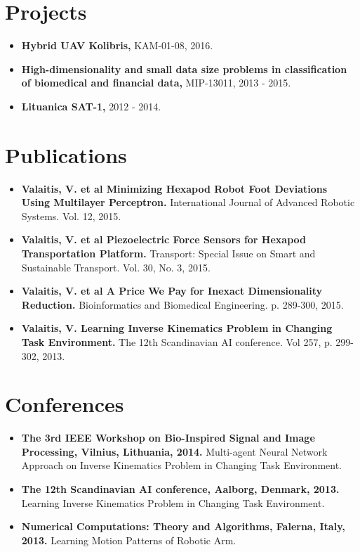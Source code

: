 \documentclass[letterpaper,11pt]{article}
\newcommand{\resumeItem}[2]{
  \item\small{
    \textbf{#1}{ #2 \vspace{-2pt}}
  }
}
\newcommand{\resumeSubItem}[2]{\resumeItem{#1}{#2}\vspace{-4pt}}
\newcommand{\resumeSubHeadingListStart}{\begin{itemize}[leftmargin=*] \renewcommand\labelitemi{$\circ$}}
\newcommand{\resumeSubHeadingListEnd}{\end{itemize}}
\begin{document}
\section{Projects}
  \resumeSubHeadingListStart
    \resumeSubItem{Hybrid UAV Kolibris,}{KAM-01-08, 2016.}
    \resumeSubItem{High-dimensionality and small data size problems in classification of biomedical and financial data,}{MIP-13011, 2013 - 2015.}
    \resumeSubItem{Lituanica SAT-1,}{2012 - 2014.}
  \resumeSubHeadingListEnd

\section{Publications}
    \resumeSubHeadingListStart
    \resumeSubItem{Valaitis, V. et al Minimizing Hexapod Robot Foot Deviations Using Multilayer Perceptron.}{International Journal of Advanced Robotic Systems. Vol. 12, 2015.}
    \resumeSubItem{Valaitis, V. et al Piezoelectric Force Sensors for Hexapod Transportation Platform.}{Transport: Special Issue on Smart and Sustainable Transport. Vol. 30, No. 3, 2015.}
    \resumeSubItem{Valaitis, V. et al A Price We Pay for Inexact Dimensionality Reduction.}{Bioinformatics and Biomedical Engineering. p. 289-300, 2015.}
    \resumeSubItem{Valaitis, V. Learning Inverse Kinematics Problem in Changing Task Environment.}{The 12th Scandinavian AI conference. Vol 257, p. 299-302, 2013.}
  \resumeSubHeadingListEnd

\section{Conferences}
  \resumeSubHeadingListStart
    \resumeSubItem{The 3rd IEEE Workshop  on Bio-Inspired Signal and Image Processing, Vilnius, Lithuania, 2014.}{Multi-agent Neural Network Approach on Inverse Kinematics Problem in Changing Task Environment.}
    \resumeSubItem{The 12th Scandinavian AI conference, Aalborg, Denmark, 2013.}{Learning Inverse Kinematics Problem in Changing Task Environment.}
    \resumeSubItem{Numerical Computations: Theory and Algorithms, Falerna, Italy, 2013.}{Learning Motion Patterns of Robotic Arm.}
  \resumeSubHeadingListEnd
\end{document}
